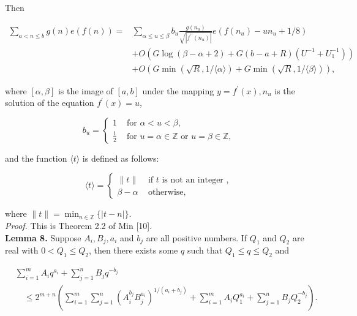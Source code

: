 \documentclass[10pt]{article}
\begin{document}
Then

$$
\begin{aligned}
\sum_{a<n \leq b} g(n) e(f(n))= & \sum_{\alpha \leq u \leq \beta} b_{u} \frac{g\left(n_{u}\right)}{\sqrt{\left|f^{\prime \prime}\left(n_{u}\right)\right|}} e\left(f\left(n_{u}\right)-u n_{u}+1 / 8\right) \\
& +O\left(G \log (\beta-\alpha+2)+G(b-a+R)\left(U^{-1}+U_{1}^{-1}\right)\right) \\
& +O(G \min (\sqrt{R}, 1 /\langle\alpha\rangle)+G \min (\sqrt{R}, 1 /\langle\beta\rangle)),
\end{aligned}
$$

where $[\alpha, \beta]$ is the image of $[a, b]$ under the mapping $y=f^{\prime}(x), n_{u}$ is the solution of the equation $f^{\prime}(x)=u$,

$$
b_{u}= \begin{cases}1 & \text { for } \alpha<u<\beta, \\ \frac{1}{2} & \text { for } u=\alpha \in \mathbb{Z} \text { or } u=\beta \in \mathbb{Z},\end{cases}
$$

and the function $\langle t\rangle$ is defined as follows:

$$
\langle t\rangle= \begin{cases}\|t\| & \text { if } t \text { is not an integer }, \\ \beta-\alpha & \text { otherwise, }\end{cases}
$$

where $\|t\|=\min _{n \in \mathbb{Z}}\{|t-n|\}$.\\[0pt]
\smallskip\noindent\textit{Proof.} This is Theorem 2.2 of Min [10].\\
\medskip\noindent\textbf{Lemma 8.} Suppose $A_{i}, B_{j}, a_{i}$ and $b_{j}$ are all positive numbers. If $Q_{1}$ and $Q_{2}$ are real with $0<Q_{1} \leq Q_{2}$, then there exists some $q$ such that $Q_{1} \leq q \leq Q_{2}$ and

$$
\begin{aligned}
& \sum_{i=1}^{m} A_{i} q^{a_{i}}+\sum_{j=1}^{n} B_{j} q^{-b_{j}} \\
& \quad \leq 2^{m+n}\left(\sum_{i=1}^{m} \sum_{j=1}^{n}\left(A_{i}^{b_{j}} B_{j}^{a_{i}}\right)^{1 /\left(a_{i}+b_{j}\right)}+\sum_{i=1}^{m} A_{i} Q_{1}^{a_{i}}+\sum_{j=1}^{n} B_{j} Q_{2}^{-b_{j}}\right).
\end{aligned}
$$
\end{document}
